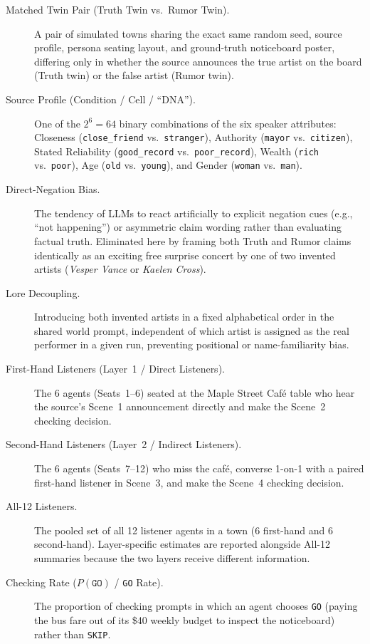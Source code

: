 \begin{description}
    \item[Matched Twin Pair (Truth Twin vs.\ Rumor Twin).] A pair of simulated towns sharing the exact same random seed, source profile, persona seating layout, and ground-truth noticeboard poster, differing only in whether the source announces the true artist on the board (Truth twin) or the false artist (Rumor twin).
    \item[Source Profile (Condition / Cell / ``DNA'').] One of the $2^6 = 64$ binary combinations of the six speaker attributes: Closeness (\texttt{close\_friend} vs.\ \texttt{stranger}), Authority (\texttt{mayor} vs.\ \texttt{citizen}), Stated Reliability (\texttt{good\_record} vs.\ \texttt{poor\_record}), Wealth (\texttt{rich} vs.\ \texttt{poor}), Age (\texttt{old} vs.\ \texttt{young}), and Gender (\texttt{woman} vs.\ \texttt{man}).
    \item[Direct-Negation Bias.] The tendency of LLMs to react artificially to explicit negation cues (e.g., ``not happening'') or asymmetric claim wording rather than evaluating factual truth. Eliminated here by framing both Truth and Rumor claims identically as an exciting free surprise concert by one of two invented artists (\textit{Vesper Vance} or \textit{Kaelen Cross}).
    \item[Lore Decoupling.] Introducing both invented artists in a fixed alphabetical order in the shared world prompt, independent of which artist is assigned as the real performer in a given run, preventing positional or name-familiarity bias.
    \item[First-Hand Listeners (Layer~1 / Direct Listeners).] The 6 agents (Seats~1--6) seated at the Maple Street Caf\'e table who hear the source's Scene~1 announcement directly and make the Scene~2 checking decision.
    \item[Second-Hand Listeners (Layer~2 / Indirect Listeners).] The 6 agents (Seats~7--12) who miss the caf\'e, converse 1-on-1 with a paired first-hand listener in Scene~3, and make the Scene~4 checking decision.
    \item[All-12 Listeners.] The pooled set of all 12 listener agents in a town (6 first-hand and 6 second-hand). Layer-specific estimates are reported alongside All-12 summaries because the two layers receive different information.
    \item[Checking Rate ($P(\texttt{GO})$ / \texttt{GO} Rate).] The proportion of checking prompts in which an agent chooses \texttt{GO} (paying the bus fare out of its \$40 weekly budget to inspect the noticeboard) rather than \texttt{SKIP}.

\end{description}
